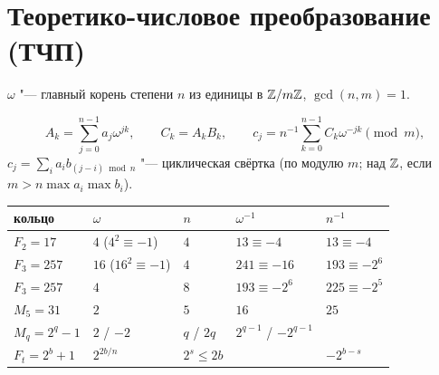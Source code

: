 \documentclass{ca-handout}
\begin{document}
\section{Теоретико-числовое преобразование (ТЧП)}
$\omega$ "--- главный корень степени $n$ из единицы в $\mathbb{Z}/m\mathbb{Z}$, $\gcd(n, m) = 1$.
\begin{reminder}[title={Прямое, обратное преобразование и свёртка}]
\[
  A_k = \sum_{j=0}^{n-1} a_j \omega^{jk}, \qquad C_k = A_k B_k, \qquad
  c_j = n^{-1} \sum_{k=0}^{n-1} C_k \omega^{-jk} \pmod m,
\]
$c_j = \sum_{i} a_i b_{(j - i) \bmod n}$ "--- циклическая свёртка (по модулю $m$; над $\mathbb{Z}$,
если $m > n \max a_i \max b_i$).
\end{reminder}
\begin{tabular}{@{}lllll@{}}
  кольцо & $\omega$ & $n$ & $\omega^{-1}$ & $n^{-1}$ \\ \hline
  $F_2 = 17$ & $4$ ($4^2 \equiv -1$) & $4$ & $13 \equiv -4$ & $13 \equiv -4$ \\
  $F_3 = 257$ & $16$ ($16^2 \equiv -1$) & $4$ & $241 \equiv -16$ & $193 \equiv -2^6$ \\
  $F_3 = 257$ & $4$ & $8$ & $193 \equiv -2^6$ & $225 \equiv -2^5$ \\
  $M_5 = 31$ & $2$ & $5$ & $16$ & $25$ \\
  $M_q = 2^q - 1$ & $2$ / $-2$ & $q$ / $2q$ & $2^{q-1}$ / $-2^{q-1}$ & \\
  $F_t = 2^b + 1$ & $2^{2b/n}$ & $2^s \le 2b$ & & $-2^{b-s}$ \\
\end{tabular}
\end{document}
